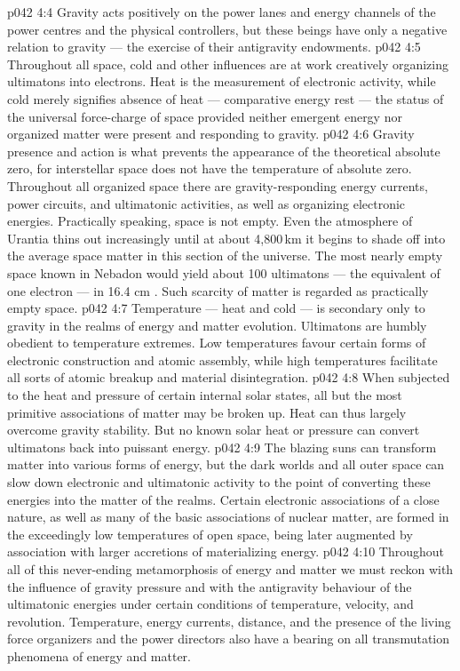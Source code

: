 \vs p042 4:4 Gravity acts positively on the power lanes and energy channels of the power centres and the physical controllers, but these beings have only a negative relation to gravity --- the exercise of their antigravity endowments.
\vs p042 4:5 Throughout all space, cold and other influences are at work creatively organizing ultimatons into electrons. Heat is the measurement of electronic activity, while cold merely signifies absence of heat --- comparative energy rest --- the status of the universal force\hyp{}charge of space provided neither emergent energy nor organized matter were present and responding to gravity.
\vs p042 4:6 Gravity presence and action is what prevents the appearance of the theoretical absolute zero, for interstellar space does not have the temperature of absolute zero. Throughout all organized space there are gravity\hyp{}responding energy currents, power circuits, and ultimatonic activities, as well as organizing electronic energies. Practically speaking, space is not empty. Even the atmosphere of Urantia thins out increasingly until at about 4,800\,km it begins to shade off into the average space matter in this section of the universe. The most nearly empty space known in Nebadon would yield about 100 ultimatons --- the equivalent of one electron --- in 16.4 cm . Such scarcity of matter is regarded as practically empty space.
\vs p042 4:7 Temperature --- heat and cold --- is secondary only to gravity in the realms of energy and matter evolution. Ultimatons are humbly obedient to temperature extremes. Low temperatures favour certain forms of electronic construction and atomic assembly, while high temperatures facilitate all sorts of atomic breakup and material disintegration.
\vs p042 4:8 When subjected to the heat and pressure of certain internal solar states, all but the most primitive associations of matter may be broken up. Heat can thus largely overcome gravity stability. But no known solar heat or pressure can convert ultimatons back into puissant energy.
\vs p042 4:9 The blazing suns can transform matter into various forms of energy, but the dark worlds and all outer space can slow down electronic and ultimatonic activity to the point of converting these energies into the matter of the realms. Certain electronic associations of a close nature, as well as many of the basic associations of nuclear matter, are formed in the exceedingly low temperatures of open space, being later augmented by association with larger accretions of materializing energy.
\vs p042 4:10 Throughout all of this never\hyp{}ending metamorphosis of energy and matter we must reckon with the influence of gravity pressure and with the antigravity behaviour of the ultimatonic energies under certain conditions of temperature, velocity, and revolution. Temperature, energy currents, distance, and the presence of the living force organizers and the power directors also have a bearing on all transmutation phenomena of energy and matter.
